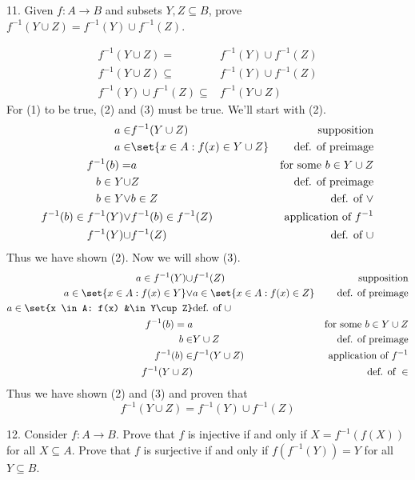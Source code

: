 \documentclass{hippoidC}
\begin{document}
\begin{prooflist}{11. Given $f: A \rightarrow B$ and subsets $Y, Z \subseteq B$,
    prove $f^{-1}(Y \cup Z)=f^{-1}(Y) \cup f^{-1}(Z)$.}
\item \imagedef{}
\setcounter{equation}{0}
\begin{align}
    f^{-1}(Y \cup Z)=&f^{-1}(Y) \cup f^{-1}(Z)\\
    f^{-1}(Y \cup Z)\subseteq &f^{-1}(Y) \cup f^{-1}(Z)\\
    f^{-1}(Y) \cup f^{-1}(Z) \subseteq & f^{-1}(Y \cup Z)
\end{align}
For (1) to be true, (2) and (3) must be true. We'll start with (2).
\begin{align}
    a\in& f^{-1}(Y\cup Z) &\text{supposition}\\
    a\in& \set{x \in A: f(x) \in Y\cup Z} &\text{def. of preimage}\\
    f^{-1}(b) =& a & \text{for some }b\in Y\cup Z\\
    b \in Y \cup& Z &\text{def. of preimage}\\
    b \in Y \lor & b \in Z &\text{def. of }\lor \\
    f^{-1}(b) \in f^{-1}(Y) \lor& f^{-1}(b) \in f^{-1}(Z)&\text{application of }f^{-1}\\
    f^{-1}(Y) \cup & f^{-1}(Z)&\text{def. of }\cup
\end{align}
Thus we have shown (2). Now we will show (3).
\begin{align}
    a\in f^{-1}(Y) \cup& f^{-1}(Z) &\text{supposition}\\
    a\in \set{x \in A: f(x) \in Y} \lor& a\in \set{x \in A: f(x) \in Z} &\text{def. of preimage}\\
    a\in \set{x \in A: f(x) &\in Y\cup Z} &\text{def. of }\cup\\
    f^{-1}(b) = a& &\text{for some }b\in Y\cup Z\\
    b \in& Y \cup Z &\text{def. of preimage}\\
    f^{-1}(b) \in& f^{-1}(Y\cup Z)&\text{application of }f^{-1}\\
    f^{-1}(Y\cup Z)&&\text{def. of }\in
\end{align}
Thus we have shown (2) and (3) and proven that
\[
    f^{-1}(Y \cup Z)=f^{-1}(Y) \cup f^{-1}(Z)
\]
\end{prooflist}

\begin{prooflist}{12. Consider $f: A \rightarrow B$. Prove that $f$ is injective
    if and only if $X=f^{-1}(f(X))$ for all $X \subseteq A$. Prove that $f$ is
surjective if and only if $f\left(f^{-1}(Y)\right)=Y$ for all $Y \subseteq B$.}
\item \imagedef{}
\inj{}
\surj{}
\end{prooflist}
\end{document}
